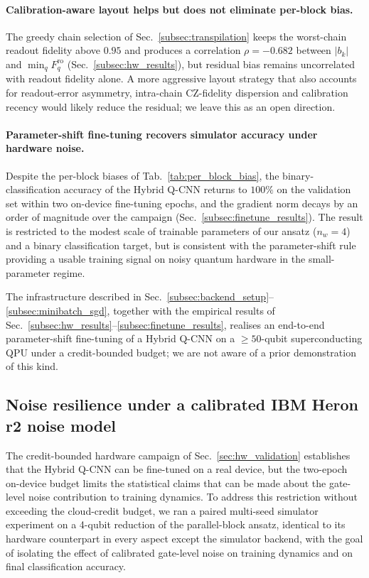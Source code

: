 \paragraph{Calibration-aware layout helps but does not eliminate per-block bias.}
The greedy chain selection of Sec.~\ref{subsec:transpilation} keeps the worst-chain readout fidelity above $0.95$ and produces a correlation $\rho=-0.682$ between $|b_k|$ and $\min_q F^{\mathrm{ro}}_q$ (Sec.~\ref{subsec:hw_results}), but residual bias remains uncorrelated with readout fidelity alone. A more aggressive layout strategy that also accounts for readout-error asymmetry, intra-chain CZ-fidelity dispersion and calibration recency would likely reduce the residual; we leave this as an open direction.

\paragraph{Parameter-shift fine-tuning recovers simulator accuracy under hardware noise.}
Despite the per-block biases of Tab.~\ref{tab:per_block_bias}, the binary-classification accuracy of the Hybrid Q-CNN returns to $100\%$ on the validation set within two on-device fine-tuning epochs, and the gradient norm decays by an order of magnitude over the campaign (Sec.~\ref{subsec:finetune_results}). The result is restricted to the modest scale of trainable parameters of our ansatz ($n_w=4$) and a binary classification target, but is consistent with the parameter-shift rule providing a usable training signal on noisy quantum hardware in the small-parameter regime.

\medskip
The infrastructure described in Sec.~\ref{subsec:backend_setup}--\ref{subsec:minibatch_sgd}, together with the empirical results of Sec.~\ref{subsec:hw_results}--\ref{subsec:finetune_results}, realises an end-to-end parameter-shift fine-tuning of a Hybrid Q-CNN on a $\geq 50$-qubit superconducting QPU under a credit-bounded budget; we are not aware of a prior demonstration of this kind.



\subsection{Noise resilience under a calibrated IBM Heron r2 noise model}
\label{sec:noise_resilience}

The credit-bounded hardware campaign of Sec.~\ref{sec:hw_validation} establishes that the Hybrid Q-CNN can be fine-tuned on a real device, but the two-epoch on-device budget limits the statistical claims that can be made about the gate-level noise contribution to training dynamics. To address this restriction without exceeding the cloud-credit budget, we ran a paired multi-seed simulator experiment on a 4-qubit reduction of the parallel-block ansatz, identical to its hardware counterpart in every aspect except the simulator backend, with the goal of isolating the effect of calibrated gate-level noise on training dynamics and on final classification accuracy.


